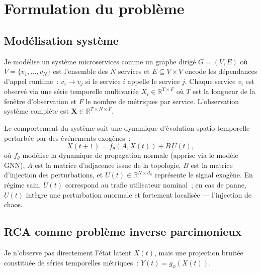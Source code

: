 \documentclass[a4paper,11pt,oneside]{report}
\begin{document}
\chapter{Formulation du probl\`eme}
\label{chap:formulation}

\section{Mod\'elisation syst\`eme}
\label{sec:modelisation}

Je mod\'elise un syst\`eme microservices comme un graphe dirig\'e $G = (V, E)$ o\`u $V = \{v_1, \ldots, v_N\}$ est l'ensemble des $N$ services et $E \subseteq V \times V$ encode les d\'ependances d'appel runtime~: $v_i \to v_j$ si le service $i$ appelle le service $j$. Chaque service $v_i$ est observ\'e via une s\'erie temporelle multivari\'ee $X_i \in \mathbb{R}^{T \times F}$ o\`u $T$ est la longueur de la fen\^etre d'observation et $F$ le nombre de m\'etriques par service. L'observation syst\`eme compl\`ete est $\mathbf{X} \in \mathbb{R}^{T \times N \times F}$.

Le comportement du syst\`eme suit une dynamique d'\'evolution spatio-temporelle perturb\'ee par des \'ev\'enements exog\`enes~:
\begin{equation}
  X(t+1) = f_\theta(A, X(t)) + B\, U(t),
  \label{eq:dynamique}
\end{equation}
o\`u $f_\theta$ mod\'elise la dynamique de propagation normale (apprise via le mod\`ele GNN), $A$ est la matrice d'adjacence issue de la topologie, $B$ est la matrice d'injection des perturbations, et $U(t) \in \mathbb{R}^{N \times d_u}$ repr\'esente le signal exog\`ene. En r\'egime sain, $U(t)$ correspond au trafic utilisateur nominal~; en cas de panne, $U(t)$ int\`egre une perturbation anormale et fortement localis\'ee --- l'injection de chaos.

\section{RCA comme probl\`eme inverse parcimonieux}
\label{sec:probleme-inverse}

Je n'observe pas directement l'\'etat latent $X(t)$, mais une projection bruit\'ee constitu\'ee de s\'eries temporelles m\'etriques~: $Y(t) = g_\phi(X(t))$.
\end{document}

